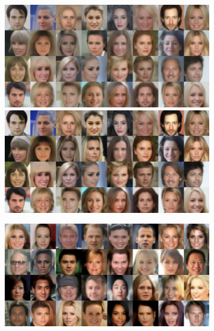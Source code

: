 \begin{figure}[h!]
  \begin{subfigure}{0.495\textwidth}
    \includegraphics[width=\linewidth]{figs/imgs/ddpm_ddim_celeba64_data_samples_T_800_5_steps_32_rec.jpg}
     \includegraphics[width=\linewidth]{figs/imgs/ddpm_ddim_celeba64_data_samples_T_900_10_steps_32_rec.jpg}
    \label{subfig:ddim_celeba64}
  \end{subfigure}
  \begin{subfigure}{0.495\textwidth}
    \includegraphics[width=\linewidth]{figs/imgs/ddpm_ddim_celeba64_data_samples_T_500_5_steps_ga_32_rec.jpg}

\end{subfigure}
\end{figure}
